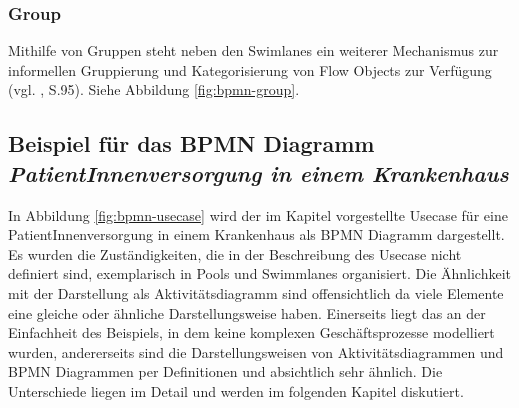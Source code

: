 \subsubsection{Group}
Mithilfe von Gruppen steht neben den Swimlanes ein weiterer Mechanismus zur informellen Gruppierung und Kategorisierung von Flow Objects zur Verfügung (vgl. \citep{BPMN2009}, S.95). Siehe Abbildung \ref{fig:bpmn-group}.


\subsection{Beispiel für das BPMN Diagramm \emph{PatientInnenversorgung in einem Krankenhaus}}

In Abbildung \ref{fig:bpmn-usecase} wird der im Kapitel  vorgestellte Usecase für eine PatientInnenversorgung in einem Krankenhaus als BPMN Diagramm dargestellt. Es wurden die Zuständigkeiten, die in der Beschreibung des Usecase nicht definiert sind, exemplarisch in Pools und Swimmlanes organisiert. Die Ähnlichkeit mit der Darstellung als Aktivitätsdiagramm sind offensichtlich da viele Elemente eine gleiche oder ähnliche Darstellungsweise haben. Einerseits liegt das an der Einfachheit des Beispiels, in dem keine komplexen Geschäftsprozesse modelliert wurden, andererseits sind die Darstellungsweisen von Aktivitätsdiagrammen und BPMN Diagrammen per Definitionen und absichtlich sehr ähnlich. Die Unterschiede liegen im Detail und werden im folgenden Kapitel diskutiert.


